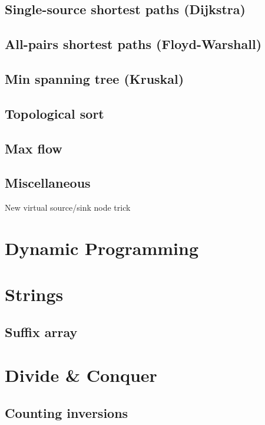 \documentclass[10pt]{article}
\begin{document}
\subsection{Single-source shortest paths (Dijkstra)}

\subsection{All-pairs shortest paths (Floyd-Warshall)}

\subsection{Min spanning tree (Kruskal)} \label{sec:kruskal}

\subsection{Topological sort}

\subsection{Max flow}

\subsection{Miscellaneous}

  New virtual source/sink node trick

\section{Dynamic Programming}

\section{Strings}

\subsection{Suffix array}

\section{Divide \& Conquer}

\subsection{Counting inversions}
\end{document}
